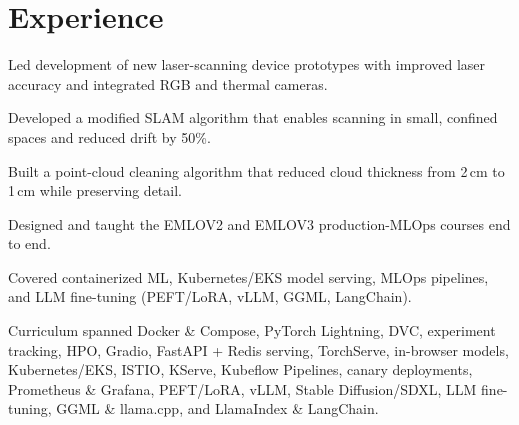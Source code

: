 \section{Experience}

\begin{points}
  \item Led development of new laser-scanning device prototypes with improved laser accuracy and integrated RGB and thermal cameras.
  \item Developed a modified SLAM algorithm that enables scanning in small, confined spaces and reduced drift by 50\%.
  \item Built a point-cloud cleaning algorithm that reduced cloud thickness from 2\,cm to 1\,cm while preserving detail.
\end{points}

\begin{points}
  \item Designed and taught the EMLOV2 and EMLOV3 production-MLOps courses end to end.
  \ifonepager
  \item Covered containerized ML, Kubernetes/EKS model serving, MLOps pipelines, and LLM fine-tuning (PEFT/LoRA, vLLM, GGML, LangChain).
  \else
  \item Curriculum spanned Docker \& Compose, PyTorch Lightning, DVC, experiment tracking, HPO, Gradio, FastAPI + Redis serving, TorchServe, in-browser models, Kubernetes/EKS, ISTIO, KServe, Kubeflow Pipelines, canary deployments, Prometheus \& Grafana, PEFT/LoRA, vLLM, Stable Diffusion/SDXL, LLM fine-tuning, GGML \& llama.cpp, and LlamaIndex \& LangChain.
  \fi
\end{points}

